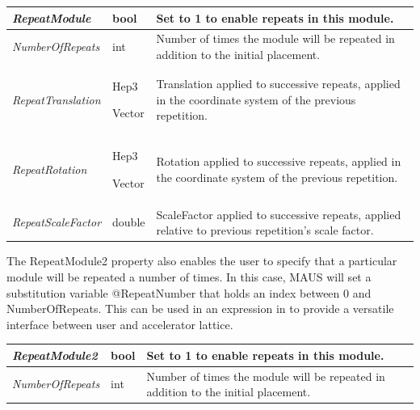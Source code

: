 \begin{center}
\tabletail{}
\tablelasttail{}
\begin{supertabular}{|m{3.892cm}|m{1.333cm}|m{11.77cm}|}
\hline
{\itshape RepeatModule} &
bool &
Set to 1 to enable repeats in this module.\\\hline
{\itshape NumberOfRepeats} &
int &
Number of times the module will be repeated in addition to the initial placement.\\\hline
{\itshape RepeatTranslation} &
Hep3

Vector &
Translation applied to successive repeats, applied in the coordinate system of the previous repetition.\\\hline
{\itshape RepeatRotation} &
Hep3

Vector &
Rotation applied to successive repeats, applied in the coordinate system of the previous repetition.\\\hline
{\itshape RepeatScaleFactor} &
double &
ScaleFactor applied to successive repeats, applied relative to previous repetition's scale factor.\\\hline
\end{supertabular}
\end{center}
The RepeatModule2 property also enables the user to specify that a particular module will be repeated a number of times.
In this case, MAUS will set a substitution variable @RepeatNumber that holds an index between 0 and NumberOfRepeats.
This can be used in an expression in to provide a versatile interface between user and accelerator lattice.

\begin{center}
\tabletail{}
\tablelasttail{}
\begin{supertabular}{|m{3.892cm}|m{1.333cm}|m{11.77cm}|}
\hline
{\itshape RepeatModule2} &
bool &
Set to 1 to enable repeats in this module.\\\hline
{\itshape NumberOfRepeats} &
int &
Number of times the module will be repeated in addition to the initial placement.\\\hline
\end{supertabular}
\end{center}

